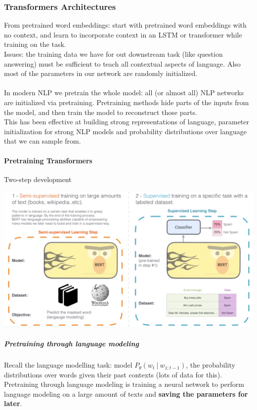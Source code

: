 \documentclass[10pt]{report}
\begin{document}
\subsubsection{Transformers Architectures}
From pretrained word embeddings: start with pretrained word embeddings with no context, and learn to incorporate context in an LSTM or transformer while training on the task.\\
Issues: the training data we have for out downstream task (like question answering) must be sufficient to teach all contextual aspects of language. Also most of the parameters in our network are randomly initialized.\\\\
In modern NLP we pretrain the whole model: all (or almost all) NLP networks are initialized via pretraining. Pretraining methods hide parts of the inputs from the model, and then train the model to reconstruct those parts.\\This has been effective at building strong representations of language, parameter initialization for strong NLP models and probability distributions over language that we can sample from.
\paragraph{Pretraining Transformers} Two-step development\begin{center}
	\includegraphics[scale=0.5]{74.png}
\end{center}
\subparagraph{Pretraining through language modeling} Recall the language modelling task: model $P_\theta(w_t\:|\:w_{1:t-1})$, the probability distributions over words given their past contexts (lots of data for this).\\Pretraining through language modeling is training a neural network to perform language modeling on a large amount of texts and \textbf{saving the parameters for later}.
\end{document}
